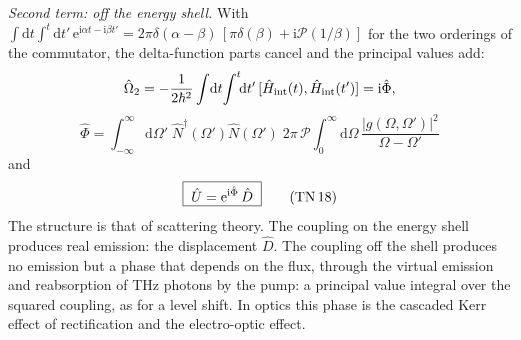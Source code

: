 \documentclass[aps,pra,onecolumn,notitlepage,11pt,amsmath,amssymb,nofootinbib]{revtex4-2}
\newcommand{\Nop}{\hat N}
\newcommand{\dd}{\mathrm{d}}
\newcommand{\ee}{\mathrm{e}}
\newcommand{\ii}{\mathrm{i}}
\newcommand{\PV}{\mathcal P}
\newcommand{\TN}[1]{\text{TN\,#1}}
\begin{document}
\emph{Second term: off the energy shell.} With
$\int\dd t\int^t\dd t'\,\ee^{\ii\alpha t-\ii\beta t'}
=2\pi\delta(\alpha-\beta)\,[\pi\delta(\beta)+\ii\PV(1/\beta)]$ for the two
orderings of the commutator, the delta-function parts cancel and the
principal values add:
\begin{equation}
\hat\Omega_2=-\frac{1}{2\hbar^2}\int\!\dd t\!\int^t\!\!\dd t'\,
[\hat H_{\rm int}(t),\hat H_{\rm int}(t')]=\ii\hat\Phi,
\end{equation}
\begin{equation}
\boxed{\;\hat\Phi=\int_{-\infty}^{\infty}\!\!\dd\Omega'\;\Nop^\dagger(\Omega')\Nop(\Omega')\;
2\pi\,\PV\!\!\int_0^\infty\!\!\dd\Omega\,\frac{|g(\Omega,\Omega')|^2}{\Omega-\Omega'}\;}
\label{eq:PhiPV}
\end{equation}
and
\begin{equation}
\boxed{\;\hat U=\ee^{\ii\hat\Phi}\,\hat D\;}
\tag{\TN{18}}
\end{equation}
The structure is that of scattering theory. The coupling on the energy shell
produces real emission: the displacement $\hat D$. The coupling off the shell
produces no emission but a phase that depends on the flux, through the
virtual emission and reabsorption of THz photons by the pump: a principal
value integral over the squared coupling, as for a level shift. In optics
this phase is the cascaded Kerr effect of rectification and the
electro-optic effect.
\end{document}
